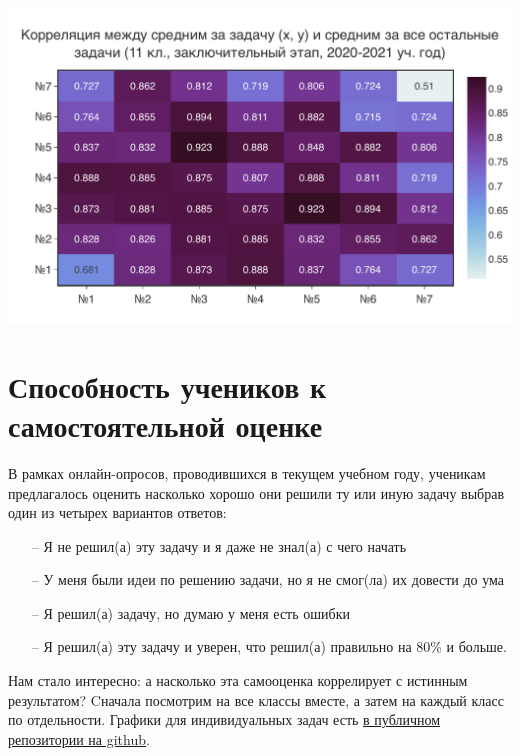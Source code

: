\includegraphics[width=\linewidth]{../export/pdf/results/2021/respa/grade11-avg.pdf}

\newpage 

\section{Способность учеников к самостоятельной оценке}

В рамках онлайн-опросов, проводившихся в текущем учебном году, ученикам предлагалось оценить насколько хорошо они решили ту или иную задачу выбрав один из четырех вариантов ответов:

\begin{itemize}
    \itemsep-0.3em
    \item[--] Я не решил(а) эту задачу и я даже не знал(а) с чего начать
    \item[--] У меня были идеи по решению задачи, но я не смог(ла) их довести до ума
    \item[--] Я решил(а) задачу, но думаю у меня есть ошибки
    \item[--] Я решил(а) эту задачу и уверен, что решил(а) правильно на 80\% и больше.
\end{itemize}

Нам стало интересно: а насколько эта самооценка коррелирует с истинным результатом? Cначала посмотрим на все классы вместе, а затем на каждый класс по отдельности. Графики для индивидуальных задач есть \href{https://github.com/anmorgunov/respa-data-analysis/tree/main/export/pdf/selfassessment/respa}{в публичном репозитории на github}.

